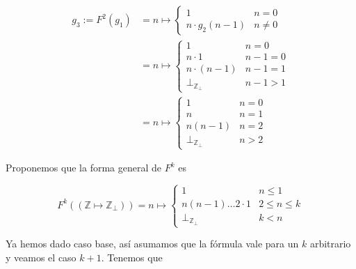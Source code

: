 \documentclass[article, 12pt]{article}
\begin{document}
\begin{align*}
  g_3 := F^2\left( g_1 \right)  
  &=
  n \mapsto \begin{cases}
    1 & n = 0 \\ 
    n \cdot g_2(n - 1) & n \neq 0
  \end{cases} \\ 
  &= n\mapsto \begin{cases}
    1 & n = 0 \\ 
    n \cdot 1 & n - 1 = 0 \\ 
    n \cdot (n-1) & n - 1 = 1 \\ 
    \bot_{\mathbb{Z}_\bot } & n - 1 > 1
  \end{cases} \\
  &= n\mapsto \begin{cases}
    1 & n = 0 \\ 
    n & n = 1 \\ 
    n(n-1) & n = 2 \\ 
    \bot_{\mathbb{Z}_\bot } & n > 2
  \end{cases} 
\end{align*}

Proponemos que la forma general de $F^k$ es 

\begin{equation*}
  F^k(\left( \mathbb{Z} \mapsto \mathbb{Z}_\bot  \right)) = n \mapsto \begin{cases}
    1 & n \leq 1 \\ 
    n(n-1)\ldots 2 \cdot 1 & 2 \leq n \leq k \\ 
    \bot_{\mathbb{Z}_\bot } & k < n
  \end{cases}
\end{equation*}

Ya hemos dado caso base, así asumamos que la fórmula vale para un $k$ arbitrario
y veamos el caso $k + 1$. Tenemos que 
\end{document}
